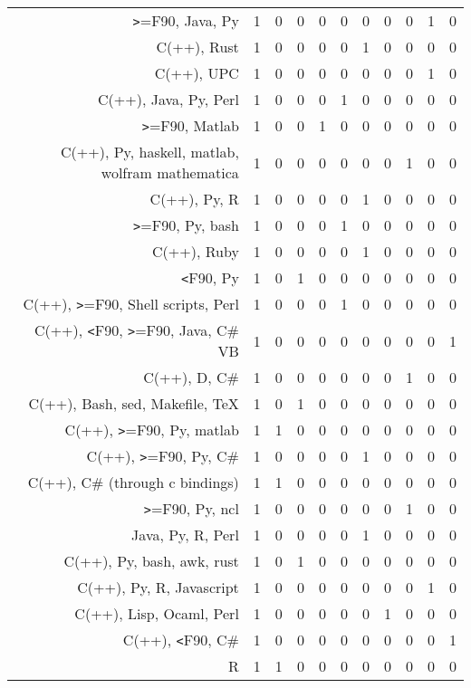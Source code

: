 {\begin{landscape}
\begin{longtable}[htb]{r|c|c|c|c|c|c|c|c|c|c}
{\verb!>!=F90, Java, Py} & 1 & 0 & 0 & 0 & 0 & 0 & 0 & 0 & 1 & 0 \\%
{C(++), Rust} & 1 & 0 & 0 & 0 & 0 & 1 & 0 & 0 & 0 & 0 \\%
{C(++), UPC} & 1 & 0 & 0 & 0 & 0 & 0 & 0 & 0 & 1 & 0 \\%
{C(++), Java, Py, Perl} & 1 & 0 & 0 & 0 & 1 & 0 & 0 & 0 & 0 & 0 \\%
{\verb!>!=F90, Matlab} & 1 & 0 & 0 & 1 & 0 & 0 & 0 & 0 & 0 & 0 \\%
{C(++), Py, haskell, matlab, wolfram mathematica} & 1 & 0 & 0 & 0 & 0 & 0 & 0 & 1 & 0 & 0 \\%
{C(++), Py, R} & 1 & 0 & 0 & 0 & 0 & 1 & 0 & 0 & 0 & 0 \\%
{\verb!>!=F90, Py, bash} & 1 & 0 & 0 & 0 & 1 & 0 & 0 & 0 & 0 & 0 \\%
{C(++), Ruby} & 1 & 0 & 0 & 0 & 0 & 1 & 0 & 0 & 0 & 0 \\%
{\verb!<!F90, Py} & 1 & 0 & 1 & 0 & 0 & 0 & 0 & 0 & 0 & 0 \\%
{C(++), \verb!>!=F90, Shell scripts, Perl} & 1 & 0 & 0 & 0 & 1 & 0 & 0 & 0 & 0 & 0 \\%
{C(++), \verb!<!F90, \verb!>!=F90, Java, C\# VB} & 1 & 0 & 0 & 0 & 0 & 0 & 0 & 0 & 0 & 1 \\%
{C(++), D, C\#} & 1 & 0 & 0 & 0 & 0 & 0 & 0 & 1 & 0 & 0 \\%
{C(++), Bash, sed, Makefile, TeX} & 1 & 0 & 1 & 0 & 0 & 0 & 0 & 0 & 0 & 0 \\%
{C(++), \verb!>!=F90, Py, matlab} & 1 & 1 & 0 & 0 & 0 & 0 & 0 & 0 & 0 & 0 \\%
{C(++), \verb!>!=F90, Py, C\#} & 1 & 0 & 0 & 0 & 0 & 1 & 0 & 0 & 0 & 0 \\%
{C(++), C\# (through c bindings)} & 1 & 1 & 0 & 0 & 0 & 0 & 0 & 0 & 0 & 0 \\%
{\verb!>!=F90, Py, ncl} & 1 & 0 & 0 & 0 & 0 & 0 & 0 & 1 & 0 & 0 \\%
{Java, Py, R, Perl} & 1 & 0 & 0 & 0 & 0 & 1 & 0 & 0 & 0 & 0 \\%
{C(++), Py, bash, awk, rust} & 1 & 0 & 1 & 0 & 0 & 0 & 0 & 0 & 0 & 0 \\%
{C(++), Py, R, Javascript} & 1 & 0 & 0 & 0 & 0 & 0 & 0 & 0 & 1 & 0 \\%
{C(++), Lisp, Ocaml, Perl} & 1 & 0 & 0 & 0 & 0 & 0 & 1 & 0 & 0 & 0 \\%
{C(++), \verb!<!F90, C\#} & 1 & 0 & 0 & 0 & 0 & 0 & 0 & 0 & 0 & 1 \\%
{R} & 1 & 1 & 0 & 0 & 0 & 0 & 0 & 0 & 0 & 0 \\%

\end{longtable}
\end{landscape}}
